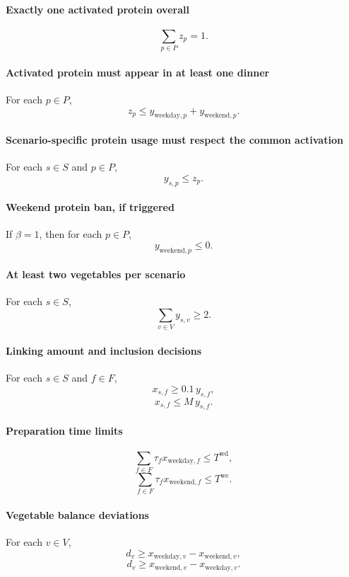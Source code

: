 \paragraph{Exactly one activated protein overall}
\[
\sum_{p \in P} z_p = 1.
\]

\paragraph{Activated protein must appear in at least one dinner}
For each \(p \in P\),
\[
z_p \le y_{\text{weekday},p} + y_{\text{weekend},p}.
\]

\paragraph{Scenario-specific protein usage must respect the common activation}
For each \(s \in S\) and \(p \in P\),
\[
y_{s,p} \le z_p.
\]

\paragraph{Weekend protein ban, if triggered}
If \(\beta=1\), then for each \(p \in P\),
\[
y_{\text{weekend},p} \le 0.
\]

\paragraph{At least two vegetables per scenario}
For each \(s \in S\),
\[
\sum_{v \in V} y_{s,v} \ge 2.
\]

\paragraph{Linking amount and inclusion decisions}
For each \(s \in S\) and \(f \in F\),
\[
x_{s,f} \ge 0.1\, y_{s,f},
\]
\[
x_{s,f} \le M\, y_{s,f}.
\]

\paragraph{Preparation time limits}
\[
\sum_{f \in F} \tau_f x_{\text{weekday},f} \le T^{\text{wd}},
\]
\[
\sum_{f \in F} \tau_f x_{\text{weekend},f} \le T^{\text{we}}.
\]

\paragraph{Vegetable balance deviations}
For each \(v \in V\),
\[
d_v \ge x_{\text{weekday},v} - x_{\text{weekend},v},
\]
\[
d_v \ge x_{\text{weekend},v} - x_{\text{weekday},v}.
\]

